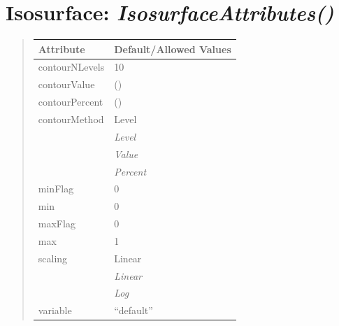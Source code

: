 \documentclass[letterpaper,10pt,english]{sphinxmanual}
\begin{document}
\section{\textbf{Isosurface}: \emph{IsosurfaceAttributes()}}
\label{attributes:isosurface-isosurfaceattributes}
\begin{DUlineblock}{0em}
\item[] 
\end{DUlineblock}
\begin{quote}

\begin{tabulary}{\linewidth}{|L|L|}
\hline

\textbf{Attribute}
 & 
\textbf{Default/Allowed Values}
\\
\hline
contourNLevels
 & 
10
\\
\hline
contourValue
 & 
()
\\
\hline
contourPercent
 & 
()
\\
\hline
contourMethod
 & 
Level
\\
\hline & 
\emph{Level}
\\
\hline & 
\emph{Value}
\\
\hline & 
\emph{Percent}
\\
\hline
minFlag
 & 
0
\\
\hline
min
 & 
0
\\
\hline
maxFlag
 & 
0
\\
\hline
max
 & 
1
\\
\hline
scaling
 & 
Linear
\\
\hline & 
\emph{Linear}
\\
\hline & 
\emph{Log}
\\
\hline
variable
 & 
``default''
\\
\hline\end{tabulary}

\end{quote}

\begin{DUlineblock}{0em}
\item[] 
\end{DUlineblock}

\begin{DUlineblock}{0em}
\item[] 
\end{DUlineblock}
\end{document}
